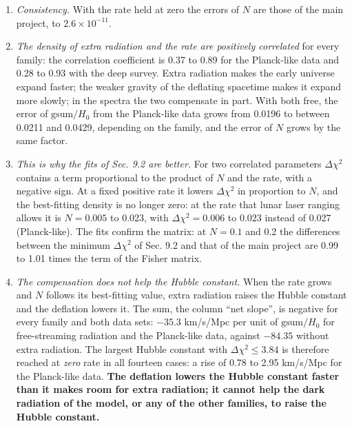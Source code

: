 \documentclass[
  10pt,
]{article}
\providecommand{\tightlist}{%
  \setlength{\itemsep}{0pt}\setlength{\parskip}{0pt}}
\begin{document}
\begin{enumerate}
\def\labelenumi{\arabic{enumi}.}
\tightlist
\item
  \emph{Consistency.} With the rate held at zero the errors of \(N\) are
  those of the main project, to \(2.6\times10^{-11}\).
\item
  \emph{The density of extra radiation and the rate are positively
  correlated} for every family: the correlation coefficient is 0.37 to
  0.89 for the Planck-like data and 0.28 to 0.93 with the deep survey.
  Extra radiation makes the early universe expand faster; the weaker
  gravity of the deflating spacetime makes it expand more slowly; in the
  spectra the two compensate in part. With both free, the error of
  \(\mathrm{gsum}/H_0\) from the Planck-like data grows from 0.0196 to
  between 0.0211 and 0.0429, depending on the family, and the error of
  \(N\) grows by the same factor.
\item
  \emph{This is why the fits of Sec. 9.2 are better.} For two correlated
  parameters \(\Delta\chi^2\) contains a term proportional to the
  product of \(N\) and the rate, with a negative sign. At a fixed
  positive rate it lowers \(\Delta\chi^2\) in proportion to \(N\), and
  the best-fitting density is no longer zero: at the rate that lunar
  laser ranging allows it is \(N=0.005\) to 0.023, with
  \(\Delta\chi^2=0.006\) to 0.023 instead of 0.027 (Planck-like). The
  fits confirm the matrix: at \(N=0.1\) and 0.2 the differences between
  the minimum \(\Delta\chi^2\) of Sec. 9.2 and that of the main project
  are 0.99 to 1.01 times the term of the Fisher matrix.
\item
  \emph{The compensation does not help the Hubble constant.} When the
  rate grows and \(N\) follows its best-fitting value, extra radiation
  raises the Hubble constant and the deflation lowers it. The sum, the
  column ``net slope'', is negative for every family and both data sets:
  \(-35.3\) km/s/Mpc per unit of \(\mathrm{gsum}/H_0\) for
  free-streaming radiation and the Planck-like data, against \(-84.35\)
  without extra radiation. The largest Hubble constant with
  \(\Delta\chi^2\le3.84\) is therefore reached at \emph{zero} rate in
  all fourteen cases: a rise of 0.78 to 2.95 km/s/Mpc for the
  Planck-like data. \textbf{The deflation lowers the Hubble constant
  faster than it makes room for extra radiation; it cannot help the dark
  radiation of the model, or any of the other families, to raise the
  Hubble constant.}
\end{enumerate}
\end{document}
